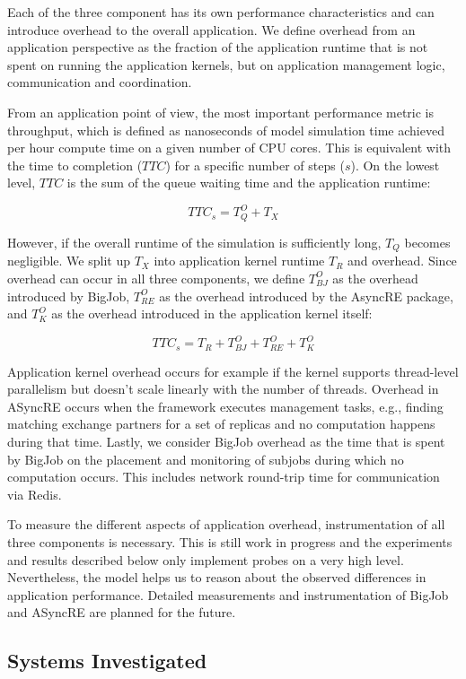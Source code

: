 \documentclass{sig-alternate}
\begin{document}
Each of the three component has its own performance characteristics and 
can introduce overhead to the overall application. We define overhead from an 
application perspective as the fraction of the application runtime that is 
not spent on running the application kernels, but on application management 
logic, communication and coordination.

From an application point of view, the most important performance metric 
is throughput, which is defined as nanoseconds of model simulation time 
achieved per hour compute time on a given number of CPU cores. This is 
equivalent with the time to completion ($TTC$) for a specific number of 
steps ($s$). On the lowest level, $TTC$ is the sum of the queue waiting time and 
the application runtime:

$$ TTC_s = T^{O}_Q + T_X $$

However, if the overall runtime of the simulation is sufficiently long, 
$T_Q$ becomes negligible. We split up $T_X$ into application 
kernel runtime $T_R$ and overhead. Since overhead can occur in all three
components, we define $T^{O}_{BJ}$ as the overhead introduced by BigJob,
$T^{O}_{RE}$ as the overhead introduced by the AsyncRE package, and 
$T^{O}_{K}$ as the overhead introduced in the application kernel itself:

$$ TTC_s = T_R + T^{O}_{BJ} + T^{O}_{RE} + T^{O}_{K}$$

Application kernel overhead occurs for example if the kernel supports 
thread-level parallelism but doesn't scale linearly with the number of 
threads. Overhead in ASyncRE occurs when the framework executes management 
tasks, e.g., finding matching exchange partners for a set of replicas and 
no computation happens during that time. Lastly, we consider BigJob 
overhead as the time that is spent by BigJob on the placement and monitoring 
of subjobs during which no computation occurs. This includes network
round-trip time for communication via Redis.

To measure the different aspects of application overhead, instrumentation 
of all three components is necessary. This is still work in progress and 
the experiments and results described below only implement probes on a 
very high level. Nevertheless, the model helps us to reason about the observed 
differences in application performance. Detailed measurements and 
instrumentation of BigJob and ASyncRE are planned for the future. 


\subsection{Systems Investigated} 
\end{document}
